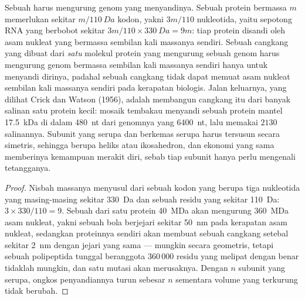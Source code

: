 \begin{proposition}\label{prop:b3:virology:economy}
Sebuah  harus mengurung genom yang menyandinya. Sebuah protein bermassa
$m$ memerlukan sekitar $m/\qty{110}{Da}$ kodon, yakni $3m/110$ nukleotida,
yaitu sepotong RNA yang berbobot sekitar $3m/110\times\qty{330}{Da} = 9m$: tiap
protein disandi oleh asam nukleat yang bermassa sembilan kali massanya sendiri.
Sebuah cangkang yang dibuat dari \emph{satu} molekul protein yang mengurung
sebuah genom harus mengurung genom bermassa sembilan kali massanya sendiri
hanya untuk menyandi dirinya, padahal sebuah cangkang tidak dapat memuat asam
nukleat sembilan kali massanya sendiri pada kerapatan biologis. Jalan
keluarnya, yang dilihat Crick dan Watson (1956), adalah membangun cangkang itu
dari banyak salinan satu protein kecil:  mosaik tembakau menyandi sebuah
protein mantel \qty{17.5}{kDa} di dalam \qty{480}{nt} dari genomnya yang
\qty{6400}{nt}, lalu memakai $2130$ salinannya. Subunit yang serupa dan
berkemas serupa harus tersusun secara simetris, sehingga   berupa
heliks atau ikosahedron, dan ekonomi yang sama memberinya kemampuan merakit
diri, sebab tiap subunit hanya perlu mengenali tetangganya.
\end{proposition}
\begin{proof}
Nisbah massanya menyusul dari sebuah kodon yang berupa tiga nukleotida yang
masing-masing sekitar \qty{330}{Da} dan sebuah residu yang sekitar
\qty{110}{Da}: $3\times 330/110 =
9$. Sebuah  dari satu protein \qty{40}{MDa} akan mengurung
\qty{360}{MDa} asam nukleat, yakni sebuah bola berjejari sekitar \qty{50}{nm}
pada kerapatan asam nukleat, sedangkan proteinnya sendiri akan membuat sebuah
cangkang setebal sekitar \qty{2}{nm} dengan jejari yang sama --- mungkin secara
geometris, tetapi sebuah polipeptida tunggal beranggota $360\,000$ residu yang
melipat dengan benar tidaklah mungkin, dan satu mutasi akan merusaknya. Dengan
$n$ subunit yang serupa, ongkos penyandiannya turun sebesar $n$ sementara
volume yang terkurung tidak berubah.
\end{proof}

